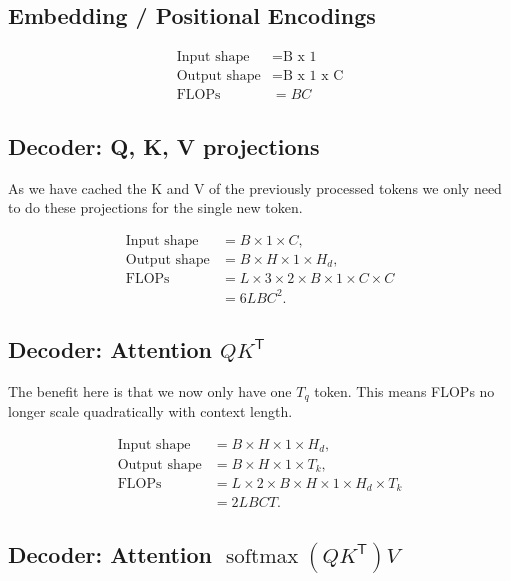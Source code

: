 \documentclass{article}
\begin{document}
\subsection{Embedding / Positional Encodings}

\begin{align}
	\text{Input shape}  &= \boxed{\text{B x 1}} \\
	\text{Output shape} &= \boxed{\text{B x 1 x C}} \\
	\text{FLOPs}        &= \boxed{BC}
\end{align}


\subsection{Decoder: Q, K, V projections}

As we have cached the K and V of the previously processed tokens we only need to do these projections for the single new token.

\begin{align}
\text{Input shape}  &= \boxed{B \times 1 \times C}, \\
\text{Output shape} &= \boxed{B \times H \times 1 \times H_d}, \\
\text{FLOPs}
   &= L \times 3 \times 2 \times B \times 1 \times C \times C \\
   &= \boxed{6L BC^2}.
\end{align}


\subsection{Decoder: Attention $QK^{\mathsf{T}}$}

The benefit here is that we now only have one $T_q$ token. This means FLOPs no longer scale quadratically with context length.

\begin{align}
\text{Input shape}  &= \boxed{B \times H \times 1 \times H_d}, \\
\text{Output shape} &= \boxed{B \times H \times 1 \times T_k}, \\
\text{FLOPs}
   &= L \times 2 \times B \times H \times 1 \times H_d \times T_k \\
   &= \boxed{2L BCT}.
\end{align}

\subsection{Decoder: Attention $\operatorname{softmax}(QK^{\mathsf{T}})V$}
\end{document}
